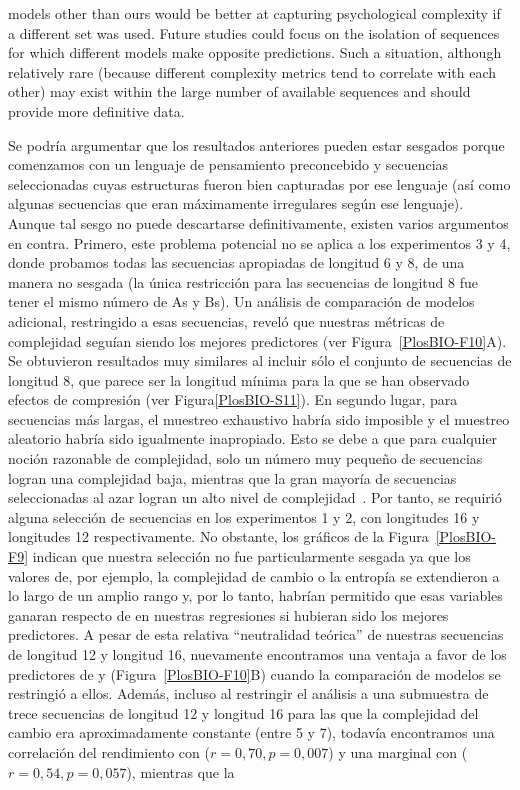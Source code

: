 models other than ours would be better at capturing psychological complexity if a different set was used. Future studies could focus on the isolation of sequences for which different models make opposite predictions. Such a situation, although relatively rare (because different complexity metrics tend to correlate with each other) may exist within the large number of available sequences and should provide more definitive data.

Se podría argumentar que los resultados anteriores pueden estar sesgados porque comenzamos con un lenguaje de pensamiento preconcebido y secuencias seleccionadas cuyas estructuras fueron bien capturadas por ese lenguaje (así como algunas secuencias que eran máximamente irregulares según ese lenguaje). Aunque tal sesgo no puede descartarse definitivamente, existen varios argumentos en contra. Primero, este problema potencial no se aplica a los experimentos 3 y 4, donde probamos todas las secuencias apropiadas de longitud 6 y 8, de una manera no sesgada (la única restricción para las secuencias de longitud 8 fue tener el mismo número de As y Bs). Un análisis de comparación de modelos adicional, restringido a esas secuencias, reveló que nuestras métricas de complejidad seguían siendo los mejores predictores (ver Figura~\ref{PlosBIO-F10}A). Se obtuvieron resultados muy similares al incluir sólo el conjunto de secuencias de longitud 8, que parece ser la longitud mínima para la que se han observado efectos de compresión (ver Figura\ref{PlosBIO-S11}). En segundo lugar, para secuencias más largas, el muestreo exhaustivo habría sido imposible y el muestreo aleatorio habría sido igualmente inapropiado. Esto se debe a que para cualquier noción razonable de complejidad, solo un número muy pequeño de secuencias logran una complejidad baja, mientras que la gran mayoría de secuencias seleccionadas al azar logran un alto nivel de complejidad~\cite{f43,li2013introduction}. Por tanto, se requirió alguna selección de secuencias en los experimentos 1 y 2, con longitudes 16 y longitudes 12 respectivamente. No obstante, los gráficos de la Figura~\ref{PlosBIO-F9} indican que nuestra selección no fue particularmente sesgada ya que los valores de, por ejemplo, la complejidad de cambio o la entropía se extendieron a lo largo de un amplio rango y, por lo tanto, habrían permitido que esas variables ganaran respecto de \mdlbin en nuestras regresiones si hubieran sido los mejores predictores. A pesar de esta relativa ``neutralidad teórica'' de nuestras secuencias de longitud 12 y longitud 16, nuevamente encontramos una ventaja a favor de los predictores de \mdlbin y \mdlbinfrag (Figura~\ref{PlosBIO-F10}B) cuando la comparación de modelos se restringió a ellos. Además, incluso al restringir el análisis a una submuestra de trece secuencias de longitud 12 y longitud 16 para las que la complejidad del cambio era aproximadamente constante (entre 5 y 7), todavía encontramos una correlación del rendimiento con \mdlbinfrag ($r = 0,70, p = 0,007$) y una marginal con \mdlbin ($r = 0,54, p = 0,057$), mientras que la 